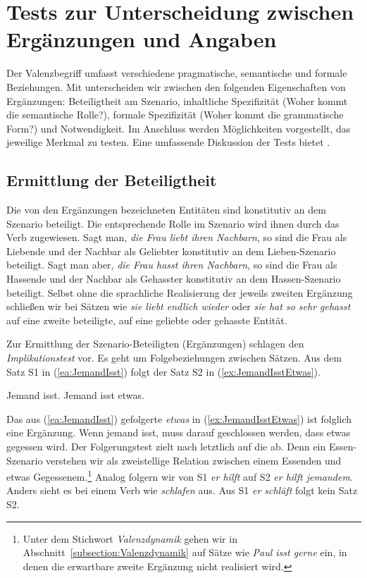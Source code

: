 \section{Tests zur Unterscheidung zwischen Ergänzungen und Angaben}\label{subsection:TestsAngabeErgänzung}    

Der Valenzbegriff umfasst verschiedene pragmatische, semantische und formale Beziehungen. Mit \citet{Jacobs1994} unterscheiden wir zwischen den folgenden Eigenschaften von Ergänzungen: Beteiligtheit am Szenario, inhaltliche Spezifizität (Woher kommt die semantische Rolle?), formale Spezifizität (Woher kommt die grammatische Form?) und Notwendigkeit. Im Anschluss werden Möglichkeiten vorgestellt, das jeweilige Merkmal zu testen. Eine umfassende Diskussion der Tests bietet \citet[Kap. 5--6]{Storrer1992}.   

\subsection{Ermittlung der Beteiligtheit}\label{subsubsection:TestBET} 

 Die von den Ergänzungen bezeichneten Entitäten sind konstitutiv an dem Szenario beteiligt. Die entsprechende Rolle im Szenario wird ihnen durch das Verb zugewiesen. Sagt man, \textit{die Frau liebt ihren Nachbarn}, so sind die Frau als Liebende und der Nachbar als Geliebter konstitutiv an dem Lieben-Szenario beteiligt. Sagt man aber, \textit{die Frau hasst ihren Nachbarn}, so sind die Frau als Hassende und der Nachbar als Gehasster konstitutiv an dem Hassen-Szenario beteiligt. Selbst ohne die sprachliche Realisierung der jeweils zweiten Ergänzung schließen wir bei Sätzen wie \textit{sie liebt endlich wieder} oder \textit{sie hat so sehr gehasst} auf eine zweite beteiligte, auf eine geliebte oder gehasste Entität.
 
 Zur Ermittlung der Szenario-Beteiligten (Ergänzungen) schlagen \citet[145]{ProjektgruppeValenz} den \textit{Implikationstest} vor. Es geht um Folgebeziehungen zwischen Sätzen. Aus dem Satz S1 in (\ref{ea:JemandIsst}) folgt der Satz S2 in (\ref{ex:JemandIsstEtwas}). 

\ea 
\ea \label{ea:JemandIsst} Jemand isst.
\ex \label{ex:JemandIsstEtwas} Jemand isst etwas. 
\z 
\z 
 
Das aus (\ref{ea:JemandIsst}) gefolgerte \textit{etwas} in (\ref{ex:JemandIsstEtwas}) ist folglich eine Ergänzung. Wenn jemand isst, muss darauf geschlossen werden, dass etwas gegessen wird. Der Folgerungstest zielt nach \citet[259]{Fischer2001} letztlich auf die  ab. Denn ein Essen-Szenario verstehen wir als zweistellige Relation zwischen einem Essenden und etwas Gegessenem.\footnote{Unter dem Stichwort \textit{Valenzdynamik} gehen wir in Abschnitt~\ref{subsection:Valenzdynamik} auf Sätze wie \textit{Paul isst gerne} ein, in denen die erwartbare zweite Ergänzung nicht realisiert wird.} Analog folgern wir von S1 \textit{er hilft} auf S2 \textit{er hilft jemandem}. Anders sieht es bei einem Verb wie \textit{schlafen} aus. Aus S1 \textit{er schläft} folgt kein Satz S2.

